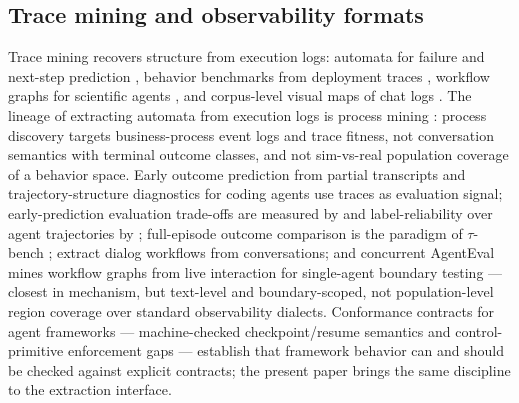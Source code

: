 \subsection{Trace mining and observability formats}
Trace mining recovers structure from execution logs: automata for failure and next-step
prediction \citep{automataTraces2026}, behavior benchmarks from deployment traces
\citep{tracedance2026}, workflow graphs for scientific agents \citep{graphoftrace2026},
and corpus-level visual maps of chat logs \citep{wildvis2024}.
The lineage of extracting automata from execution logs is process mining \citep{vanDerAalst2012process}:
process discovery targets business-process event logs and trace fitness, not conversation
semantics with terminal outcome classes, and not sim-vs-real population coverage of a
behavior space.
Early outcome prediction from partial transcripts \citep{nourbakhsh2026tracer} and
trajectory-structure diagnostics for coding agents \citep{resolveRate2026} use traces as
evaluation signal; early-prediction evaluation trade-offs are measured by
\citet{earlyeval2026} and label-reliability over agent trajectories by
\citet{falsesuccess2026}; full-episode outcome comparison is the paradigm of
$\tau$-bench \citep{sierra2024taubench}; \citet{salesforce2025workflows} extract dialog
workflows from conversations; and concurrent {AgentEval} \citep{agenteval2026} mines
workflow graphs from live interaction for single-agent boundary testing --- closest in
mechanism, but text-level and boundary-scoped, not population-level region coverage over
standard observability dialects.
Conformance contracts for agent frameworks --- machine-checked checkpoint/resume semantics
\citep{resume2026} and control-primitive enforcement gaps \citep{stopmeansstop2026} ---
establish that framework behavior can and should be checked against explicit contracts; the
present paper brings the same discipline to the extraction interface.

